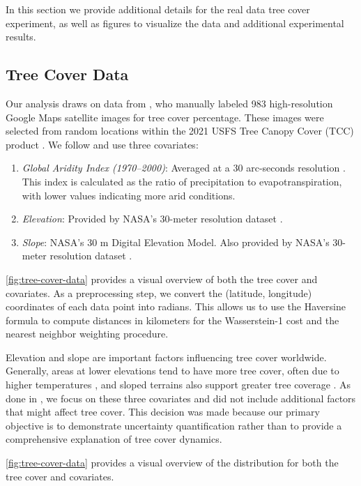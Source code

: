 In this section we provide additional details for the real data tree cover experiment, as well as figures to visualize the data and additional experimental results. 

\subsection{Tree Cover Data}

Our analysis draws on data from \citet{lu2024quantifying}, who manually labeled 983 high-resolution Google Maps satellite images for tree cover percentage. These images were selected from random locations within the 2021 USFS Tree Canopy Cover (TCC) product \citep{usfs2023treecover}. We follow \citet{lu2024quantifying} and use three covariates: 
\begin{enumerate}
    \item \textit{Global Aridity Index (1970--2000)}: Averaged at a 30 arc-seconds resolution \citep{trabucco2019global}. This index is calculated as the ratio of precipitation to evapotranspiration, with lower values indicating more arid conditions.
    \item \textit{Elevation}: Provided by NASA’s 30-meter resolution dataset \citep{nasadem2020}.
    \item \textit{Slope}: NASA’s 30 m Digital Elevation Model. Also provided by NASA’s 30-meter resolution dataset \citep{nasadem2020}.
\end{enumerate}

\cref{fig:tree-cover-data} provides a visual overview of both the tree cover and covariates.  
As a preprocessing step, we convert the (latitude, longitude) coordinates of each data point into radians. This allows us to use the Haversine formula to compute distances in kilometers for the Wasserstein-1 cost and the nearest neighbor weighting procedure.


Elevation and slope are important factors influencing tree cover worldwide. Generally, areas at lower elevations tend to have more tree cover, often due to higher temperatures \citep{mayor2017elevation}, and sloped terrains also support greater tree coverage \citep{sandel2013human}. As done in \citet{lu2024quantifying}, we focus on these three covariates and did not include additional factors that might affect tree cover. This decision was made because our primary objective is to demonstrate uncertainty quantification rather than to provide a comprehensive explanation of tree cover dynamics.

\cref{fig:tree-cover-data} provides a visual overview of the distribution for both the tree cover and covariates. 


